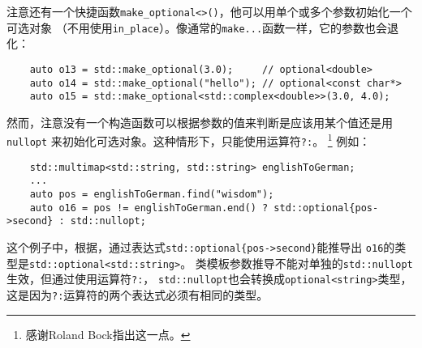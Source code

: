 注意还有一个快捷函数\texttt{make\_optional<>()}，他可以用单个或多个参数初始化一个可选对象
（不用使用\texttt{in\_place}）。像通常的\texttt{make...}函数一样，它的参数也会退化：
\begin{lstlisting}
    auto o13 = std::make_optional(3.0);     // optional<double>
    auto o14 = std::make_optional("hello"); // optional<const char*>
    auto o15 = std::make_optional<std::complex<double>>(3.0, 4.0);
\end{lstlisting}
然而，注意没有一个构造函数可以根据参数的值来判断是应该用某个值还是用\texttt{nullopt}
来初始化可选对象。这种情形下，只能使用运算符\texttt{?:}。
\footnote{感谢Roland Bock指出这一点。}
例如：
\begin{lstlisting}
    std::multimap<std::string, std::string> englishToGerman;
    ...
    auto pos = englishToGerman.find("wisdom");
    auto o16 = pos != englishToGerman.end() ? std::optional{pos->second} : std::nullopt;
\end{lstlisting}
这个例子中，根据，通过表达式\texttt{std::optional\{pos->second\}}能推导出
\texttt{o16}的类型是\texttt{std::optional<std::string>}。
类模板参数推导不能对单独的\texttt{std::nullopt}生效，但通过使用运算符\texttt{?:}，
\texttt{std::nullopt}也会转换成\texttt{optional<string>}类型，
这是因为\texttt{?:}运算符的两个表达式必须有相同的类型。

